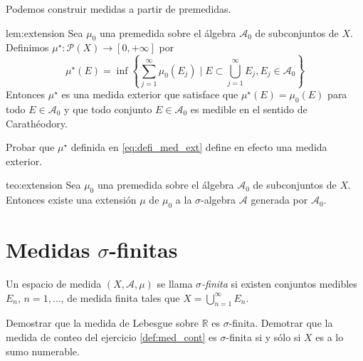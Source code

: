 Podemos construir medidas a partir de premedidas.

\begin{lema}{lem:extension}
 Sea $\mu_0$ una premedida sobre el álgebra  $\mathscr{A}_0$ de subconjuntos de $X$. Definimos  $\mu^\star:\mathcal{P}(X)\to [0,+\infty]$ por
 \begin{equation}\label{eq:defi_med_ext}
  \mu^\star(E)=\inf\left\{ \sum_{j=1}^{\infty}\mu_0(E_j)\mid E\subset \bigcup_{j=1}^{\infty}E_j, E_j\in\mathcal{A}_0  \right\}
 \end{equation}
 Entonces $\mu^\star$ es una medida exterior que satisface que $\mu^\star(E)=\mu_0(E)$ para todo $E\in\mathcal{A}_0$ y que todo conjunto 
$E\in\mathcal{A}_0$ es medible en el sentido de Carathéodory. 
\end{lema}

 \begin{demo} 
  


\begin{ejercicio}{} Probar que $\mu^\star$ definida en \eqref{eq:defi_med_ext} define en efecto una medida exterior.
 
\end{ejercicio}



 \end{demo}

 
\begin{teorema}{teo:extension}
  Sea $\mu_0$ una premedida sobre el álgebra  $\mathscr{A}_0$ de subconjuntos de $X$. Entonces existe una extensión $\mu$ de $\mu_0$ a la $\sigma$-algebra   $\mathscr{A}$ generada por  $\mathscr{A}_0$.
\end{teorema}

\section{Medidas $\sigma$-finitas}

\begin{definicion}{} Un espacio de medida $(X,\mathcal{A},\mu)$ se llama \emph{$\sigma$-finita}  si existen conjuntos medibles $E_n$, $n=1,\ldots$, de medida finita tales que $X=\bigcup_{n=1}^{\infty}E_n$. 
 
\end{definicion}

\begin{ejercicio}{}
 Demostrar que la medida de Lebesgue sobre $\mathbb{R}$ es $\sigma$-finita. Demotrar que la medida de conteo del ejercicio \ref{def:med_cont}  es $\sigma$-finita si y sólo si $X$ es a lo sumo numerable.
\end{ejercicio}




